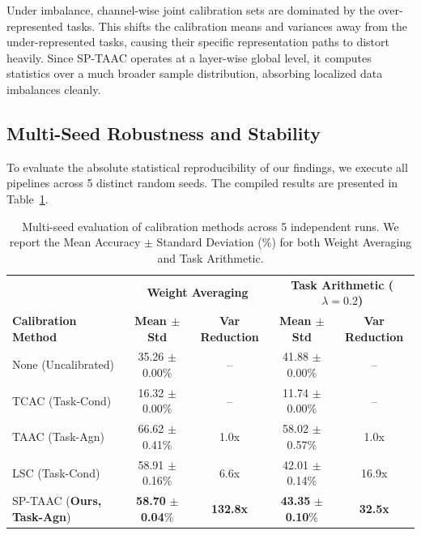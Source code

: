 \documentclass{article}
\theoremstyle{plain}
\theoremstyle{definition}
\theoremstyle{remark}
\begin{document}
Under imbalance, channel-wise joint calibration sets are dominated by the over-represented tasks. This shifts the calibration means and variances away from the under-represented tasks, causing their specific representation paths to distort heavily. Since SP-TAAC operates at a layer-wise global level, it computes statistics over a much broader sample distribution, absorbing localized data imbalances cleanly.

\subsection{Multi-Seed Robustness and Stability}
To evaluate the absolute statistical reproducibility of our findings, we execute all pipelines across 5 distinct random seeds. The compiled results are presented in Table~\ref{tab:multi_seed}.

\begin{table}[t]
\caption{Multi-seed evaluation of calibration methods across 5 independent runs. We report the Mean Accuracy $\pm$ Standard Deviation (\%) for both Weight Averaging and Task Arithmetic.}
\label{tab:multi_seed}
\begin{center}
\begin{tabular}{l|cc|cc}
\toprule
& \multicolumn{2}{c|}{\textbf{Weight Averaging}} & \multicolumn{2}{c}{\textbf{Task Arithmetic ($\lambda = 0.2$)}} \\
\textbf{Calibration Method} & \textbf{Mean $\pm$ Std} & \textbf{Var Reduction} & \textbf{Mean $\pm$ Std} & \textbf{Var Reduction} \\
\midrule
None (Uncalibrated) & 35.26 $\pm$ 0.00\% & -- & 41.88 $\pm$ 0.00\% & -- \\
TCAC (Task-Cond) & 16.32 $\pm$ 0.00\% & -- & 11.74 $\pm$ 0.00\% & -- \\
TAAC (Task-Agn) & 66.62 $\pm$ 0.41\% & 1.0x & 58.02 $\pm$ 0.57\% & 1.0x \\
LSC (Task-Cond) & 58.91 $\pm$ 0.16\% & 6.6x & 42.01 $\pm$ 0.14\% & 16.9x \\
SP-TAAC (\textbf{Ours, Task-Agn}) & \textbf{58.70} $\pm$ \textbf{0.04}\% & \textbf{132.8x} & \textbf{43.35} $\pm$ \textbf{0.10}\% & \textbf{32.5x} \\
\bottomrule
\end{tabular}
\end{center}
\end{table}
\end{document}
